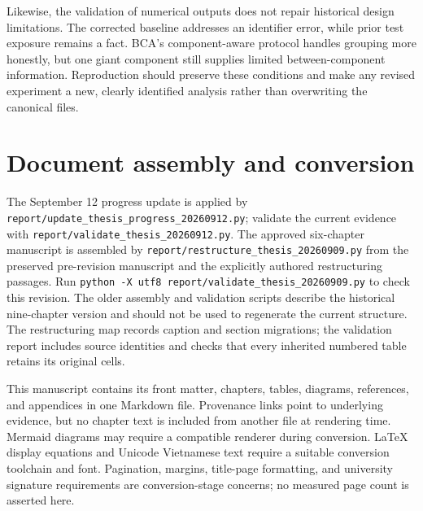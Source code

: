 Likewise, the validation of numerical outputs does not repair historical design limitations. The corrected baseline addresses an identifier error, while prior test exposure remains a fact. BCA's component-aware protocol handles grouping more honestly, but one giant component still supplies limited between-component information. Reproduction should preserve these conditions and make any revised experiment a new, clearly identified analysis rather than overwriting the canonical files.

\section{Document assembly and conversion}

The September 12 progress update is applied by \texttt{report/u\allowbreak{}pdate\_th\allowbreak{}esis\_pro\allowbreak{}gress\_20\allowbreak{}260912.p\allowbreak{}y}; validate the current evidence with \texttt{report/v\allowbreak{}alidate\_\allowbreak{}thesis\_2\allowbreak{}0260912.\allowbreak{}py}. The approved six-chapter manuscript is assembled by \texttt{report/r\allowbreak{}estructu\allowbreak{}re\_thesi\allowbreak{}s\_202609\allowbreak{}09.py} from the preserved pre-revision manuscript and the explicitly authored restructuring passages. Run \texttt{python -\allowbreak{}X utf8 r\allowbreak{}eport/va\allowbreak{}lidate\_t\allowbreak{}hesis\_20\allowbreak{}260909.p\allowbreak{}y} to check this revision. The older assembly and validation scripts describe the historical nine-chapter version and should not be used to regenerate the current structure. The restructuring map records caption and section migrations; the validation report includes source identities and checks that every inherited numbered table retains its original cells.

This manuscript contains its front matter, chapters, tables, diagrams, references, and appendices in one Markdown file. Provenance links point to underlying evidence, but no chapter text is included from another file at rendering time. Mermaid diagrams may require a compatible renderer during conversion. LaTeX display equations and Unicode Vietnamese text require a suitable conversion toolchain and font. Pagination, margins, title-page formatting, and university signature requirements are conversion-stage concerns; no measured page count is asserted here.

